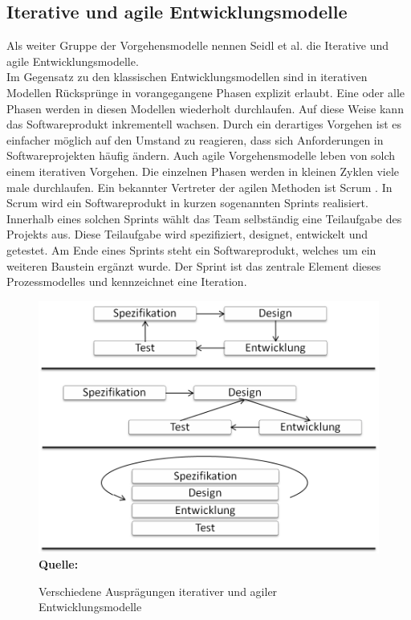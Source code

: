 \subsection{Iterative und agile Entwicklungsmodelle}
\label{subsec:iterative_und_agile_entwicklungsmodelle}
Als weiter Gruppe der Vorgehensmodelle nennen Seidl et al. \cite[vgl. S.23 ff.]{seidl_basiswissen_2012} die Iterative und agile Entwicklungsmodelle.\\
Im Gegensatz zu den klassischen Entwicklungsmodellen sind in iterativen Modellen Rücksprünge in vorangegangene Phasen explizit erlaubt. Eine oder alle Phasen werden in diesen Modellen wiederholt durchlaufen. Auf diese Weise kann das Softwareprodukt inkrementell wachsen. Durch ein derartiges Vorgehen ist es einfacher möglich auf den Umstand zu reagieren, dass sich Anforderungen in Softwareprojekten häufig ändern. Auch agile Vorgehensmodelle leben von solch einem iterativen Vorgehen. Die einzelnen Phasen werden in kleinen Zyklen viele male durchlaufen.
Ein bekannter Vertreter der agilen Methoden ist Scrum \cite{schwaber_agile_2002}. In Scrum wird ein Softwareprodukt in kurzen sogenannten Sprints realisiert. Innerhalb eines solchen Sprints wählt das Team selbständig eine Teilaufgabe des Projekts aus. Diese Teilaufgabe wird spezifiziert, designet, entwickelt und getestet. Am Ende eines Sprints steht ein Softwareprodukt, welches um ein weiteren Baustein ergänzt wurde.
Der Sprint ist das zentrale Element dieses Prozessmodelles und kennzeichnet eine Iteration.
\begin{figure}[htb]
  \centering  
  \includegraphics[scale=0.8]{img/iterativeentwicklungsmodelle.png}\\
  \footnotesize\sffamily\textbf{Quelle:} \cite[vgl. S.24]{seidl_basiswissen_2012}
  \caption{Verschiedene Ausprägungen iterativer und agiler Entwicklungsmodelle}
  \label{fig:verschiedene_auspraegungen_iterativer_und_agiler_entwicklungsmodelle}
\end{figure}
